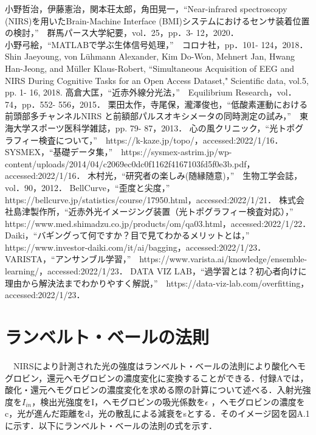 \documentclass[a4j,12pt]{jreport}
\begin{document}
\begin{thebibliography}{99}
小野哲治，伊藤憲治，関本荘太郎，角田晃一，“Near-infrared spectroscopy (NIRS)を用いたBrain-Machine Interface (BMI)システムにおけるセンサ装着位置の検討，”　群馬パース大学紀要，vol．25，pp．3- 12，2020．\\
小野弓絵，“MATLABで学ぶ生体信号処理，”　コロナ社，pp．101- 124，2018．
Shin Jaeyoung, von Lühmann Alexander, Kim Do-Won, Mehnert Jan, Hwang Han-Jeong, and Müller Klaus-Robert, ``Simultaneous Acquisition of EEG and NIRS During Cognitive Tasks for an Open Access Dataset," Scientific data, vol.5, pp. 1- 16, 2018.
高倉大匡，“近赤外線分光法，”　Equilibrium Research，vol．74，pp．552- 556，2015．
栗田太作，寺尾保，瀧澤俊也，“低酸素運動における前頭部多チャンネルNIRS と前額部パルスオキシメータの同時測定の試み，”　東海大学スポーツ医科学雑誌，pp. 79- 87，2013．
心の風クリニック，“光トポグラフィー検査について，”　https://k-kaze.jp/topo/，accessed:2022/1/16．
SYSMEX，“基礎データ集，”　https://sysmex-astrim.jp/wp-content/uploads/2014/04/c2069ec0dc0f1162f4167103fd5f0e3b.pdf，accessed:2022/1/16．
木村光，“研究者の楽しみ(随縁随意)，”　生物工学会誌，vol．90，2012．
BellCurve，“歪度と尖度，”　https://bellcurve.jp/statistics/course/17950.html，accessed:2022/1/21．
株式会社島津製作所，“近赤外光イメージング装置（光トポグラフィー検査対応），”　https://www.med.shimadzu.co.jp/products/om/qa03.html，accessed:2022/1/22．
Daiki，“バギングって何ですか？目で見てわかるメリットとは，”　https://www.investor-daiki.com/it/ai/bagging，accessed:2022/1/23．
VARISTA，“アンサンブル学習，”　https://www.varista.ai/knowledge/ensemble-learning/，accessed:2022/1/23．
DATA VIZ LAB，“過学習とは？初心者向けに理由から解決法までわかりやすく解説，”　https://data-viz-lab.com/overfitting，accessed:2022/1/23．
\end{thebibliography}

\appendix
\chapter{ランベルト・ベールの法則}
　NIRSにより計測された光の強度はランベルト・ベールの法則により酸化ヘモグロビン，還元ヘモグロビンの濃度変化に変換することができる．付録Aでは，酸化・還元ヘモグロビンの濃度変化を求める際の計算について述べる．入射光強度を$I_{in}$，検出光強度をI，ヘモグロビンの吸光係数を$\epsilon$ ，ヘモグロビンの濃度をc，光が進んだ距離をd，光の散乱による減衰をsとする．そのイメージ図を図A.1に示す．以下にランベルト・ベールの法則の式を示す．\\
\end{document}
